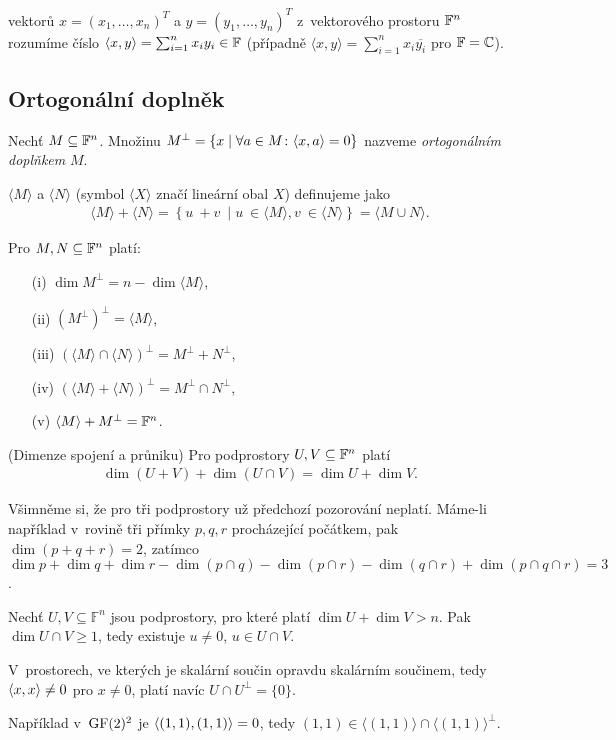  vektorů $x=(x_1,\dots,x_n)^T$ a $y=(y_1,\dots,y_n)^T$ z~vektorového prostoru $\mathbb{F}^n$ rozumíme číslo $\langle x,y\rangle=\sum_{i=1}^nx_iy_i\in\mathbb{F}$ (případně $\langle x,y\rangle=\sum_{i=1}^nx_i\overline{y_i}$ pro $\mathbb{F}=\mathbb{C}$).

\medskip
\subsection{Ortogonální doplněk}


\df Nechť $M \subseteq \mathbb{F}^n$. Množinu $M^\bot = \{x \mid \forall a\in M\colon {\langle x,a\rangle} = 0\}$ nazveme {\it ortogonálním doplňkem} $M$.

 $\langle M\rangle$ a $\langle N\rangle$ (symbol $\langle X\rangle$ značí lineární obal $X$) definujeme jako
\begin{align}
\langle M\rangle + \langle N\rangle = \left\{ u~+ v~\mid u~\in \langle M\rangle, v~\in \langle N \rangle\right\} = \langle M\cup N\rangle.
\end{align}

\poz Pro $M,N\subseteq\mathbb{F}^n$ platí:
\begin{enumerate}\itemsep1pt \parskip0pt 
	\item[(i)] $\dim M^\bot = n - \dim \langle M\rangle$,
	\item[(ii)] ${(M^\bot)}^\bot = \langle M\rangle$,
	\item[(iii)] $(\langle M\rangle \cap \langle N\rangle)^\bot = M^\bot + N^\bot$,
	\item[(iv)] $(\langle M\rangle+\langle N\rangle)^\bot = M^\bot \cap N^\bot$,
	\item[(v)] $\langle M\rangle + M^\bot =\mathbb{F}^n$.
\end{enumerate}

\vt (Dimenze spojení a průniku) Pro podprostory $U,V\subseteq\mathbb{F}^n$ platí \begin{align}
\dim(U + V) + \dim(U \cap V) = \dim U+ \dim V.
\end{align}

Všimněme si, že pro tři podprostory už předchozí pozorování neplatí. Máme-li například v~rovině tři přímky $p,q,r$ procházející počátkem, pak $\dim(p + q + r) =2$, zatímco $\dim p + \dim q + \dim r - \dim(p \cap q) - \dim(p \cap r) - \dim(q \cap r) + \dim(p \cap q \cap r)=3$.

\dsl Nechť $U,V \subseteq \mathbb{F}^n$ jsou podprostory, pro které platí $\dim U + \dim V > n$. Pak $\dim U \cap V \ge 1$, tedy existuje $u \neq 0$, $u \in U\cap V$.

\dsl V~prostorech, ve kterých je skalární součin opravdu skalárním součinem, tedy ${\langle x,x\rangle} \neq 0$ pro $x\neq 0$, platí navíc $U\cap U^\bot = \{0\}$.

\medskip
Například v~$\mathrm{GF}(2)^2$ je ${\langle (1,1), (1,1)\rangle} = 0$, tedy $(1,1)\in\langle(1,1)\rangle\cap\langle(1,1)\rangle^\bot$.